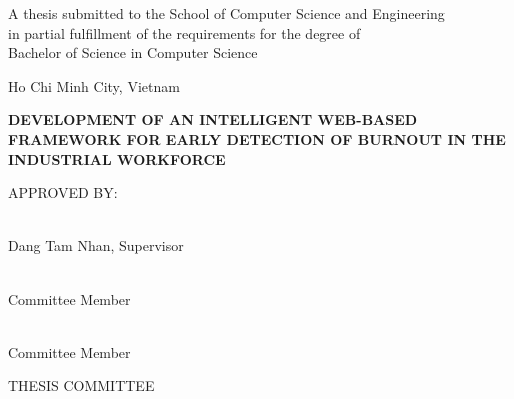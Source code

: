 \documentclass[12pt,a4paper]{article}
\begin{document}
\begin{titlepage}
  \vspace{0.6cm}

  {\normalsize
    A thesis submitted to the School of Computer Science and Engineering\\
    in partial fulfillment of the requirements for the degree of\\
    Bachelor of Science in Computer Science\par}

  \vfill

  {\normalsize Ho Chi Minh City, Vietnam\par}
  \vspace{0.2cm}
  {\normalsize \the\year\par}
\end{titlepage}


\setcounter{page}{1}


\newpage
\thispagestyle{empty}
\begin{center}
  \singlespacing

  {\bfseries
    DEVELOPMENT OF AN INTELLIGENT WEB-BASED FRAMEWORK
    FOR EARLY DETECTION OF BURNOUT
    IN THE INDUSTRIAL WORKFORCE
    \par}

  \vspace{2.2cm}

  APPROVED BY:

  \vspace{1.5cm}

  \makebox[4.2in]{\hrulefill}\\{}
  Dang Tam Nhan, Supervisor

  \vspace{1.3cm}

  \makebox[4.2in]{\hrulefill}\\{}
  Committee Member

  \vspace{1.3cm}

  \makebox[4.2in]{\hrulefill}\\{}
  Committee Member

  \vspace{1.8cm}

  THESIS COMMITTEE
\end{center}
\end{document}
